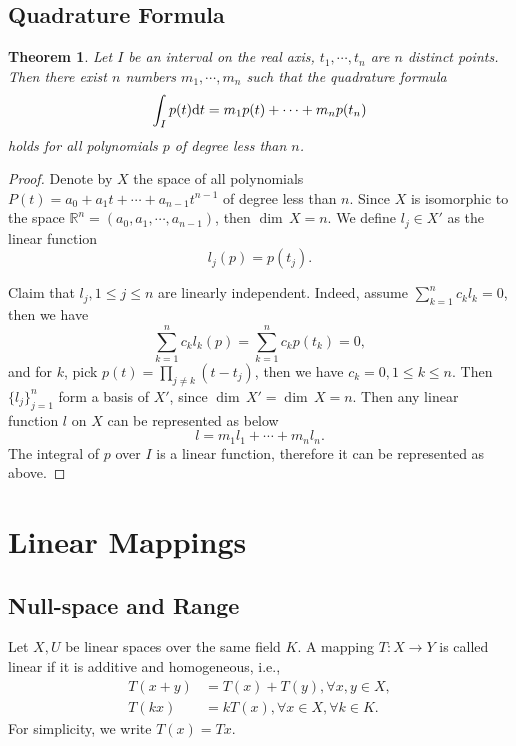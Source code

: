 \documentclass[11pt]{book}
\newtheorem{theorem}{Theorem}[chapter]
\theoremstyle{definition}
\numberwithin{equation}{chapter}
\begin{document}
\section{Quadrature Formula}
\begin{theorem}
Let $I$ be an interval on the real axis, $t_1, \cdots, t_n$ are $n$ distinct points. Then there exist $n$ numbers $m_1,\cdots,m_n$ such that the quadrature formula
\begin{align*}
    \int_I p(t) {\rm d}t = m_1 p(t) + \cdots + m_n p(t_n)
\end{align*}
holds for all polynomials $p$ of degree less than $n$.
\end{theorem}
\begin{proof}
Denote by $X$ the space of all polynomials $P(t) = a_0 + a_1 t +\cdots+ a_{n-1}t^{n-1}$ of degree less than $n$. Since $X$ is isomorphic to the space $\mathbb{R}^n = (a_0,a_1,\cdots,a_{n-1})$, then $ \dim \,X = n$. We define $l_j\in X'$ as the linear function 
$$l_j(p) = p(t_j).$$

Claim that $l_j, 1\leq j \leq n$ are linearly independent. Indeed, assume $\sum^n_{k=1}c_k l_k = 0$, then we have 
$$\sum^n_{k=1}c_k l_k(p) = \sum^n_{k=1}c_k p(t_k) = 0,$$
and for $k$, pick $p(t) = \prod_{j\neq k}(t - t_j)$, then we have $c_k = 0, 1\leq k\leq n$. Then $\{l_j\}^n_{j=1}$ form a basis of $X'$, since $ \dim \,X' =  \dim \,X = n$. Then any linear function $l$ on $X$ can be represented as below
$$l = m_1 l_1 + \cdots + m_n l_n.$$
The integral of $p$ over $I$ is a linear function, therefore it can be represented as above.
\end{proof}


\medskip

\chapter{Linear Mappings}
\section{Null-space and Range}

Let $X,U$ be linear spaces over the same field $K$. A mapping $T:X\to Y$ is called linear if it is additive and homogeneous, i.e.,
\begin{align*}
    T(x+y) &= T(x)+T(y), \forall x,y \in X,\\
    T(k x) &= k T(x), \forall x\in X, \forall k\in K.
\end{align*}
For simplicity, we write $T(x) = T x$.
\end{document}
